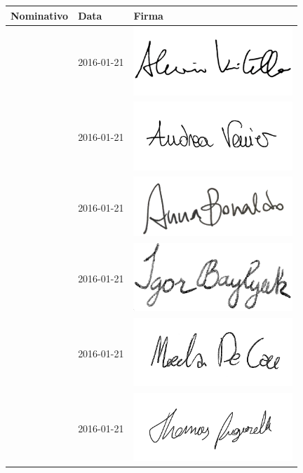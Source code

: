 \documentclass[12pt,a4paper]{article}
\begin{document}
\begin{table}[H]
	\begin{center}
		\begin{tabular}{l l l}
			\toprule
            \textbf{Nominativo}	& \textbf{Data} & \textbf{Firma} \\ \midrule
			\midrule
			\AVI{} & 2016-01-21 & \includegraphics[width=6cm]{../img/firmaVitella.png} \\ \midrule
			\AVE{} & 2016-01-21 & \includegraphics[width=6cm]{../img/firmaVenier.png} \\ \midrule
			\AB{} & 2016-01-21 & \includegraphics[width=6cm]{../img/firmaBonaldo.png} \\ \midrule
            \IB{} & 2016-01-21 & \includegraphics[width=6cm]{../img/firmaBaylyak.png} \\ \midrule
            \NDC{} & 2016-01-21 & \includegraphics[width=6cm]{../img/firmaDeCao.png} \\ \midrule
			\TP{} & 2016-01-21 & \includegraphics[width=6cm]{../img/firmaPigarelli.png} \\ \midrule

\end{tabular}
\end{center}
\end{table}
\end{document}
